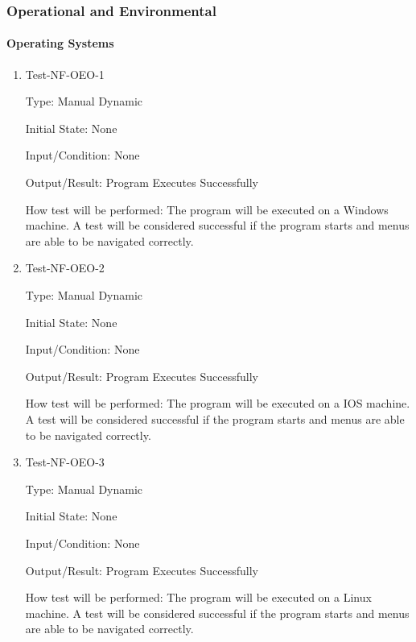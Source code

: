 \documentclass[12pt, titlepage]{article}
\makeatletter
\def\itemlabel#1#2{\def\@currentlabel{#2}\phantomsection\label{#1}}
\makeatother
\begin{document}
\subsubsection{Operational and Environmental}

\itemlabel{para:NFOEO}{Test-NF-OEO-X}
\paragraph{Operating Systems}

\begin{enumerate}

\item{Test-NF-OEO-1\\}

Type: Manual Dynamic
					
Initial State: None
					
Input/Condition: None
					
Output/Result: Program Executes Successfully
					
How test will be performed: The program will be executed on a Windows machine. A test will be considered successful if the program starts and menus are able to be navigated correctly. 

\item{Test-NF-OEO-2\\}

Type: Manual Dynamic
					
Initial State: None
					
Input/Condition: None
					
Output/Result: Program Executes Successfully
					
How test will be performed: The program will be executed on a IOS machine. A test will be considered successful if the program starts and menus are able to be navigated correctly. 

\item{Test-NF-OEO-3\\}

Type: Manual Dynamic
					
Initial State: None
					
Input/Condition: None
					
Output/Result: Program Executes Successfully
					
How test will be performed: The program will be executed on a Linux machine. A test will be considered successful if the program starts and menus are able to be navigated correctly. 

\end{enumerate}
\end{document}
